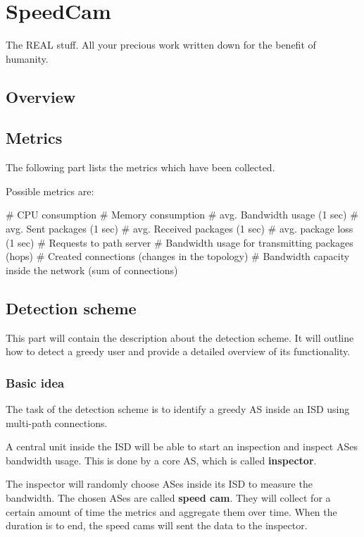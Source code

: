 \documentclass[thesis.tex]{subfiles}
\begin{document}
\chapter{SpeedCam}\label{chap:basics}

The REAL stuff. All your precious work written down for the benefit of humanity.

\section{Overview}

\section{Metrics}
The following part lists the metrics which have been collected.

Possible metrics are:

\begin{easylist}
    \MyListProperties
    # CPU consumption
    # Memory consumption
    # avg. Bandwidth usage (1 sec)
    # avg. Sent packages (1 sec)
    # avg. Received packages (1 sec)  
    # avg. package loss (1 sec)  
    # Requests to path server
    # Bandwidth usage for transmitting packages (hops)
    # Created connections (changes in the topology)
    # Bandwidth capacity inside the network (sum of connections)
\end{easylist} 

\section{Detection scheme}
This part will contain the description about the detection scheme. It will outline how to detect a greedy user and provide a detailed overview of its functionality.

\subsection{Basic idea}
The task of the detection scheme is to identify a greedy AS inside an ISD using multi-path connections. 

A central unit inside the ISD will be able to start an inspection and inspect ASes bandwidth usage. This is done by a core AS, which is called \textbf{inspector}. 

The inspector will randomly choose ASes inside its ISD to measure the bandwidth. The chosen ASes are called \textbf{speed cam}. They will collect for a certain amount of time the metrics and aggregate them over time. When the duration is to end, the speed cams will sent the data to the inspector.
\end{document}
